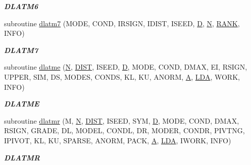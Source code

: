 \begin{DoxyCompactItemize}
\begin{DoxyCompactList}\small\item\em {\bfseries D\+L\+A\+T\+M6} \end{DoxyCompactList}\item 
subroutine \hyperlink{group__double__matgen_ga8aa127ed6d5f49ec4eafb49c111d9a7b}{dlatm7} (M\+O\+D\+E, C\+O\+N\+D, I\+R\+S\+I\+G\+N, I\+D\+I\+S\+T, I\+S\+E\+E\+D, \hyperlink{odrpack_8h_a7dae6ea403d00f3687f24a874e67d139}{D}, \hyperlink{polmisc_8c_a0240ac851181b84ac374872dc5434ee4}{N}, \hyperlink{splinemodule_8c_a3a88bcc63386de30443dacede2e01847}{R\+A\+N\+K}, I\+N\+F\+O)
\begin{DoxyCompactList}\small\item\em {\bfseries D\+L\+A\+T\+M7} \end{DoxyCompactList}\item 
subroutine \hyperlink{group__double__matgen_gabfc94c3c7b833edf3e9ed1f3afc1459d}{dlatme} (\hyperlink{polmisc_8c_a0240ac851181b84ac374872dc5434ee4}{N}, \hyperlink{superlu__enum__consts_8h_af00a42ecad444bbda75cde1b64bd7e72ac04fbbdf0d80a4ad25e565541deeebd7}{D\+I\+S\+T}, I\+S\+E\+E\+D, \hyperlink{odrpack_8h_a7dae6ea403d00f3687f24a874e67d139}{D}, M\+O\+D\+E, C\+O\+N\+D, D\+M\+A\+X, E\+I, R\+S\+I\+G\+N, U\+P\+P\+E\+R, S\+I\+M, D\+S, M\+O\+D\+E\+S, C\+O\+N\+D\+S, K\+L, K\+U, A\+N\+O\+R\+M, \hyperlink{classA}{A}, \hyperlink{example__user_8c_ae946da542ce0db94dced19b2ecefd1aa}{L\+D\+A}, W\+O\+R\+K, I\+N\+F\+O)
\begin{DoxyCompactList}\small\item\em {\bfseries D\+L\+A\+T\+M\+E} \end{DoxyCompactList}\item 
subroutine \hyperlink{group__double__matgen_ga7a230b091365727c700ff3cf446a14b7}{dlatmr} (M, \hyperlink{polmisc_8c_a0240ac851181b84ac374872dc5434ee4}{N}, \hyperlink{superlu__enum__consts_8h_af00a42ecad444bbda75cde1b64bd7e72ac04fbbdf0d80a4ad25e565541deeebd7}{D\+I\+S\+T}, I\+S\+E\+E\+D, S\+Y\+M, \hyperlink{odrpack_8h_a7dae6ea403d00f3687f24a874e67d139}{D}, M\+O\+D\+E, C\+O\+N\+D, D\+M\+A\+X, R\+S\+I\+G\+N, G\+R\+A\+D\+E, D\+L, M\+O\+D\+E\+L, C\+O\+N\+D\+L, D\+R, M\+O\+D\+E\+R, C\+O\+N\+D\+R, P\+I\+V\+T\+N\+G, I\+P\+I\+V\+O\+T, K\+L, K\+U, S\+P\+A\+R\+S\+E, A\+N\+O\+R\+M, P\+A\+C\+K, \hyperlink{classA}{A}, \hyperlink{example__user_8c_ae946da542ce0db94dced19b2ecefd1aa}{L\+D\+A}, I\+W\+O\+R\+K, I\+N\+F\+O)
\begin{DoxyCompactList}\small\item\em {\bfseries D\+L\+A\+T\+M\+R} \end{DoxyCompactList}\item 

\end{DoxyCompactItemize}
